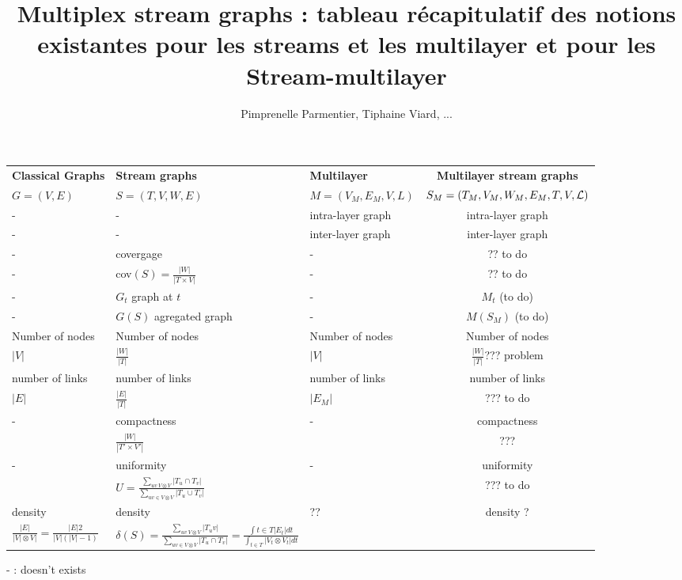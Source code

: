 \documentclass[dvipsnames,a4paper,11pt]{article}
\title{Multiplex stream graphs : tableau récapitulatif des notions existantes pour les streams et les multilayer et pour les Stream-multilayer}
\author{Pimprenelle Parmentier, Tiphaine Viard, ...}
\begin{document}
    \maketitle
	\begin{tabularx}{\linewidth}{|X||X|X||c|}
		\hline
		\textbf{Classical Graphs} & \textbf{Stream graphs} & \textbf{Multilayer} & \textbf{Multilayer stream graphs}\\
		$G=(V,E)$ & $S = (T,V,W,E)$ &  $M= (V_M,E_M,V,L)$ & $S_M = (T_M, V_M, W_M, E_M, T, V, {\cal L})$\\
		\hline
		\hline
		- & - & intra-layer graph & intra-layer graph\\
		\hline
		- & - & inter-layer graph & inter-layer graph \\
		\hline
		\hline
		- & covergage & - & ?? to do\\
		- & cov$(S)=\frac{|W|}{|T\times V|}$&-&?? to do\\
		\hline
		- & $G_t$ graph at $t$ & - & $M_t$ (to do) \\
		\hline
		- & $G(S)$ agregated graph & - & $M(S_M)$ (to do) \\
		\hline
		Number of nodes & Number of nodes & Number of nodes & Number of nodes \\
		$|V|$ & $\frac{|W|}{|T|}$ & $|V|$ & $\frac{|W|}{|T|}$??? problem\\
		\hline
		number of links & number of links & number of links & number of links\\
		$|E|$ & $\frac{|E|}{|T|}$ & $|E_M|$ & ??? to do\\
		\hline
		- & compactness & - & compactness \\
		 & $\frac{|W|}{|T'\times V'|}$& &???\\
		 \hline
		 - & uniformity & - & uniformity \\
		 & $U = \frac{\sum_{uv \ V \otimes V}{|T_u \cap T_v|}}{\sum_{uv \in V\otimes V}{|T_u\cup T_v|}}$& & ??? to do\\
		 \hline
		 density & density & ?? & density ? \\
		 $\frac{|E|}{|V|\otimes V|} = \frac{|E|2}{|V|(|V|-1)} $& $\delta(S) = \frac{\sum_{uv \ V \otimes V}{|T_uv|}}{\sum_{uv \in V\otimes V}{|T_u\cap T_v|}}= \frac{\int{t\in T}{|E_t|dt}}{\int_{t\in T}{|V_t\otimes V_t|dt}}$ & & \\
		 \hline
		 \hline
		 
	\end{tabularx}
	- : doesn't exists
\end{document}
